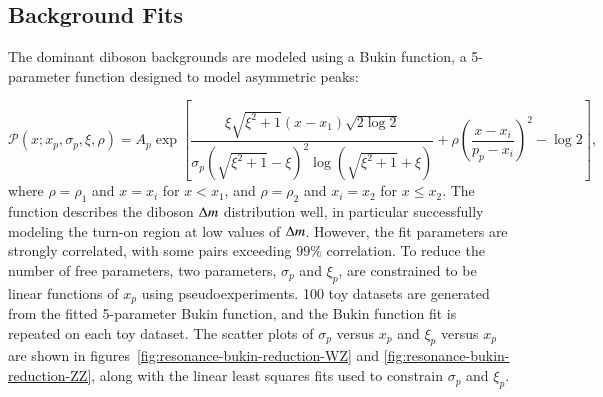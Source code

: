 \clearpage

\subsection{Background Fits}\label{sec:resonance-background-model}
The dominant diboson backgrounds are modeled using a Bukin function, a 5-parameter function designed to model asymmetric peaks:

\begin{equation}
\mathcal{P}(x;x_p ,\sigma_p, \xi ,\rho)=A_p \exp \left [ \frac{\xi \sqrt{\xi^2+1} (x-x_1) \sqrt{2\log2}}{\sigma_p(\sqrt{\xi^2+1}-\xi)^2 \log (\sqrt{\xi^2+1}+\xi)}+ \rho( \frac{x-x_i}{p_p-x_i})^2 - \log2\right ] ,
\end{equation}
where $\rho = \rho_1$ and $x = x_i$ for $x < x_1$, and $\rho = \rho_2$ and $x_i = x_2$ for $x \leq x_2$. The function describes the diboson $\Delta m$ distribution well, in particular successfully modeling the turn-on region at low values of $\Delta m$. However, the fit parameters are strongly correlated, with some pairs exceeding $99\%$ correlation. To reduce the number of free parameters, two parameters, $\sigma_p$ and $\xi_p$, are constrained to be linear functions of $x_p$ using pseudoexperiments. 100 toy datasets are generated from the fitted 5-parameter Bukin function, and the Bukin function fit is repeated on each toy dataset. The scatter plots of $\sigma_p$ versus $x_p$ and $\xi_p$ versus $x_p$ are shown in figures~\ref{fig:resonance-bukin-reduction-WZ} and \ref{fig:resonance-bukin-reduction-ZZ}, along with the linear least squares fits used to constrain $\sigma_p$ and $\xi_p$. 


